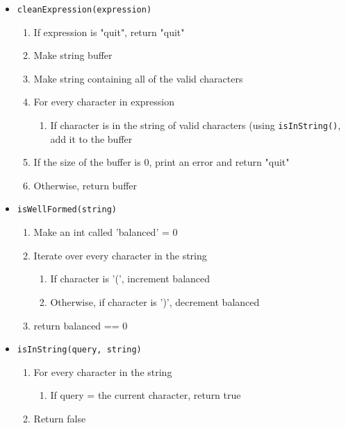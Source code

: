 \documentclass{article}
\begin{document}
\begin{itemize}
            \item{\texttt{cleanExpression(expression)}}
                \begin{enumerate}
                    \item If expression is "quit", return "quit"
                    \item Make string buffer
                    \item Make string containing all of the valid characters
                    \item For every character in expression
                        \begin{enumerate}
                            \item If character is in the string of valid characters (using \texttt{isInString()},
                            add it to the buffer
                        \end{enumerate}
                    \item If the size of the buffer is 0, print an error and return "quit"
                    \item Otherwise, return buffer
                \end{enumerate}

            \item{\texttt{isWellFormed(string)}}
                \begin{enumerate}
                    \item Make an int called 'balanced' = 0
                    \item{Iterate over every character in the string}
                        \begin{enumerate}
                            \item If character is '(', increment balanced
                            \item Otherwise, if character is ')', decrement balanced
                        \end{enumerate}
                    \item return balanced == 0
                \end{enumerate}

            \item{\texttt{isInString(query, string)}}
                \begin{enumerate}
                    \item For every character in the string
                        \begin{enumerate}
                            \item If query = the current character, return true
                        \end{enumerate}
                    \item Return false
                \end{enumerate}

                
        \end{itemize}
\end{document}
